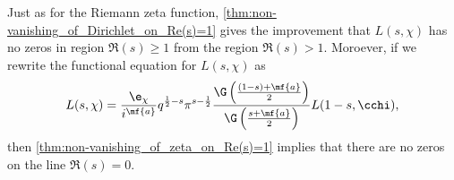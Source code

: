       Just as for the Riemann zeta function, \cref{thm:non-vanishing_of_Dirichlet_on_Re(s)=1} gives the improvement that $L(s,\chi)$ has no zeros in region $\Re(s) \ge 1$ from the region $\Re(s) > 1$. Moroever, if we rewrite the functional equation for $L(s,\chi)$ as
      \[
        L(s,\chi) = \frac{\e_{\chi}}{i^{\mf{a}}}q^{\frac{1}{2}-s}\pi^{s-\frac{1}{2}}\frac{\G\left(\frac{(1-s)+\mf{a}}{2}\right)}{\G\left(\frac{s+\mf{a}}{2}\right)}L(1-s,\cchi),
      \]
      then \cref{thm:non-vanishing_of_zeta_on_Re(s)=1} implies that there are no zeros on the line $\Re(s) = 0$.